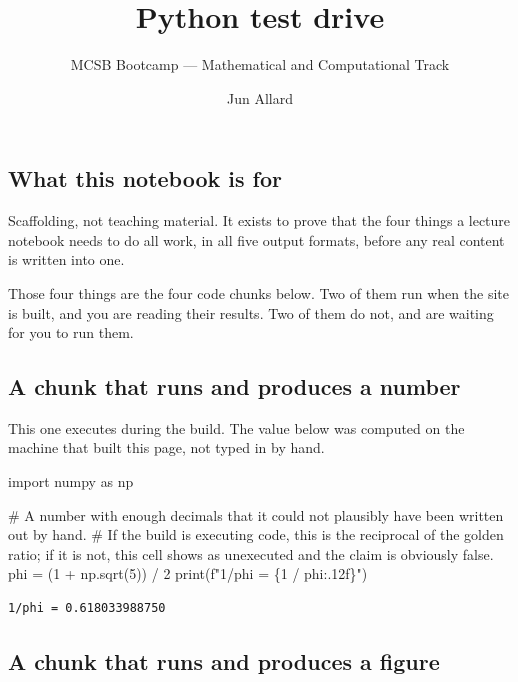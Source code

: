 \documentclass[
  letterpaper,
  DIV=11,
  numbers=noendperiod]{scrartcl}
\title{Python test drive}
\subtitle{MCSB Bootcamp --- Mathematical and Computational Track}
\author{Jun Allard}
\date{}
\newenvironment{Shaded}{\begin{snugshade}}{\end{snugshade}}
\newcommand{\BuiltInTok}[1]{\textcolor[rgb]{0.00,0.23,0.31}{#1}}
\newcommand{\CommentTok}[1]{\textcolor[rgb]{0.37,0.37,0.37}{#1}}
\newcommand{\DecValTok}[1]{\textcolor[rgb]{0.68,0.00,0.00}{#1}}
\newcommand{\ImportTok}[1]{\textcolor[rgb]{0.00,0.46,0.62}{#1}}
\newcommand{\NormalTok}[1]{\textcolor[rgb]{0.00,0.23,0.31}{#1}}
\newcommand{\OperatorTok}[1]{\textcolor[rgb]{0.37,0.37,0.37}{#1}}
\newcommand{\SpecialCharTok}[1]{\textcolor[rgb]{0.37,0.37,0.37}{#1}}
\newcommand{\SpecialStringTok}[1]{\textcolor[rgb]{0.13,0.47,0.30}{#1}}
\begin{document}
\maketitle


\subsection{What this notebook is for}\label{what-this-notebook-is-for}

Scaffolding, not teaching material. It exists to prove that the four
things a lecture notebook needs to do all work, in all five output
formats, before any real content is written into one.

Those four things are the four code chunks below. Two of them run when
the site is built, and you are reading their results. Two of them do
not, and are waiting for you to run them.

\subsection{A chunk that runs and produces a
number}\label{a-chunk-that-runs-and-produces-a-number}

This one executes during the build. The value below was computed on the
machine that built this page, not typed in by hand.

\begin{Shaded}
\begin{Highlighting}[]
\ImportTok{import}\NormalTok{ numpy }\ImportTok{as}\NormalTok{ np}

\CommentTok{\# A number with enough decimals that it could not plausibly have been written out by hand.}
\CommentTok{\# If the build is executing code, this is the reciprocal of the golden ratio; if it is not, this cell shows as unexecuted and the claim is obviously false.}
\NormalTok{phi }\OperatorTok{=}\NormalTok{ (}\DecValTok{1} \OperatorTok{+}\NormalTok{ np.sqrt(}\DecValTok{5}\NormalTok{)) }\OperatorTok{/} \DecValTok{2}
\BuiltInTok{print}\NormalTok{(}\SpecialStringTok{f"1/phi = }\SpecialCharTok{\{}\DecValTok{1} \OperatorTok{/}\NormalTok{ phi}\SpecialCharTok{:.12f\}}\SpecialStringTok{"}\NormalTok{)}
\end{Highlighting}
\end{Shaded}

\begin{verbatim}
1/phi = 0.618033988750
\end{verbatim}

\subsection{A chunk that runs and produces a
figure}\label{a-chunk-that-runs-and-produces-a-figure}
\end{document}
